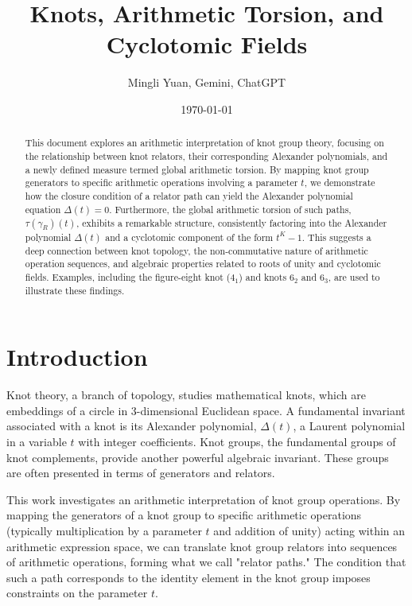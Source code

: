 \documentclass{article}[a4paper,12pt]
\title{Knots, Arithmetic Torsion, and Cyclotomic Fields}
\author{Mingli Yuan, Gemini, ChatGPT}
\date{\today}
\begin{document}
\maketitle

\begin{abstract}
This document explores an arithmetic interpretation of knot group theory, focusing on the relationship between knot relators, their corresponding Alexander polynomials, and a newly defined measure termed global arithmetic torsion. By mapping knot group generators to specific arithmetic operations involving a parameter $t$, we demonstrate how the closure condition of a relator path can yield the Alexander polynomial equation $\Delta(t)=0$. Furthermore, the global arithmetic torsion of such paths, $\tau(\gamma_R)(t)$, exhibits a remarkable structure, consistently factoring into the Alexander polynomial $\Delta(t)$ and a cyclotomic component of the form $t^K-1$. This suggests a deep connection between knot topology, the non-commutative nature of arithmetic operation sequences, and algebraic properties related to roots of unity and cyclotomic fields. Examples, including the figure-eight knot ($4_1$) and knots $6_2$ and $6_3$, are used to illustrate these findings.
\end{abstract}

\section{Introduction}

Knot theory, a branch of topology, studies mathematical knots, which are embeddings of a circle in 3-dimensional Euclidean space. A fundamental invariant associated with a knot is its Alexander polynomial, $\Delta(t)$, a Laurent polynomial in a variable $t$ with integer coefficients. Knot groups, the fundamental groups of knot complements, provide another powerful algebraic invariant. These groups are often presented in terms of generators and relators.

This work investigates an arithmetic interpretation of knot group operations. By mapping the generators of a knot group to specific arithmetic operations (typically multiplication by a parameter $t$ and addition of unity) acting within an arithmetic expression space, we can translate knot group relators into sequences of arithmetic operations, forming what we call "relator paths." The condition that such a path corresponds to the identity element in the knot group imposes constraints on the parameter $t$.
\end{document}
